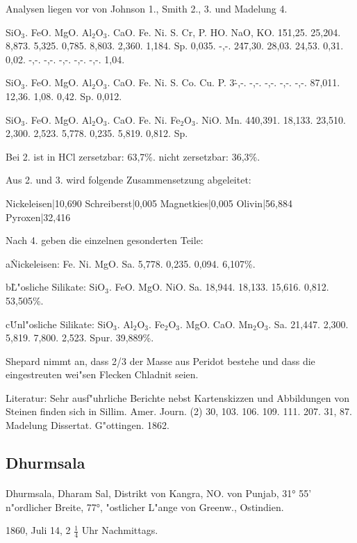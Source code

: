 \documentclass[a4paper, 11pt, oneside]{article}
\begin{document}
Analysen liegen vor von Johnson 1., Smith 2., 3. und Madelung 4.

SiO$_{3}$. FeO. MgO. Al$_{2}$O$_{3}$. CaO. Fe. Ni. S. Cr, P. HO. NaO, KO.  
1\. 51,25. 25,204. 8,873. 5,325. 0,785. 8,803. 2,360. 1,184. Sp. 0,035. -,-.  
2\. 47,30. 28,03. 24,53. 0,31. 0,02. -,-. -,-. -,-. -,-. -,-. 1,04.  

SiO$_{3}$. FeO. MgO. Al$_{2}$O$_{3}$. CaO. Fe. Ni. S. Co. Cu. P.  
3\. -,-. -,-. -,-. -,-. -,-. 87,011. 12,36. 1,08. 0,42. Sp. 0,012.  

SiO$_{3}$. FeO. MgO. Al$_{2}$O$_{3}$. CaO. Fe. Ni. Fe$_{2}$O$_{3}$. NiO. Mn.  
4\. 40,391. 18,133. 23,510. 2,300. 2,523. 5,778. 0,235. 5,819. 0,812. Sp.

Bei 2. ist in HCl zersetzbar: 63,7\%. nicht zersetzbar: 36,3\%.

Aus 2. und 3. wird folgende Zusammensetzung abgeleitet:

Nickeleisen|10,690  
Schreiberst|0,005  
Magnetkies|0,005  
Olivin|56,884  
Pyroxen|32,416

Nach 4. geben die einzelnen gesonderten Teile:

a\. Nickeleisen:  
Fe. Ni. MgO. Sa.  
5,778. 0,235. 0,094. 6,107\%.

b\. L"osliche Silikate:  
SiO$_{3}$. FeO. MgO. NiO. Sa.  
18,944. 18,133. 15,616. 0,812. 53,505\%.

c\. Unl"osliche Silikate:  
SiO$_{3}$. Al$_{2}$O$_{3}$. Fe$_{2}$O$_{3}$. MgO. CaO. Mn$_{2}$O$_{3}$. Sa.  
21,447. 2,300. 5,819. 7,800. 2,523. Spur. 39,889\%.

Shepard nimmt an, dass 2/3 der Masse aus Peridot bestehe und dass die eingestreuten wei"sen Flecken Chladnit seien.

Literatur: Sehr ausf"uhrliche Berichte nebst Kartenskizzen und Abbildungen von Steinen finden sich in Sillim. Amer. Journ. (2) 30, 103. 106. 109. 111. 207. 31, 87. Madelung Dissertat. G"ottingen. 1862.

\subsection{Dhurmsala}
\normalsize
\paragraph{}
Dhurmsala, Dharam Sal, Distrikt von Kangra, NO. von Punjab, 31° 55' n"ordlicher Breite, 77°, "ostlicher L"ange von Greenw., Ostindien.

1860, Juli 14, 2 $\frac{1}{4}$ Uhr Nachmittags.
\end{document}
